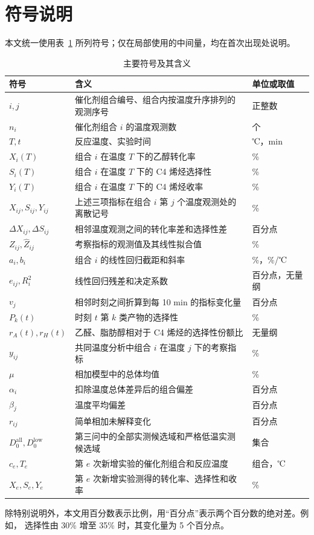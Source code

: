 \section{符号说明}\label{sec:symbols}

本文统一使用表~\ref{tab:symbols} 所列符号；仅在局部使用的中间量，均在首次出现处说明。

\begin{table}[H]
\centering
\caption{主要符号及其含义}
\label{tab:symbols}
\small
\renewcommand{\arraystretch}{1.12}
\setlength{\tabcolsep}{6pt}
\begin{tabular}{
  >{\centering\arraybackslash}p{2.8cm}
  p{8.8cm}
  >{\centering\arraybackslash}p{2.8cm}}
\toprule
符号 & 含义 & 单位或取值 \\
\midrule
\(i,j\) & 催化剂组合编号、组合内按温度升序排列的观测序号 & 正整数 \\
\(n_i\) & 催化剂组合 \(i\) 的温度观测数 & 个 \\
\(T,t\) & 反应温度、实验时间 & ℃，min \\
\(X_i(T)\) & 组合 \(i\) 在温度 \(T\) 下的乙醇转化率 & \% \\
\(S_i(T)\) & 组合 \(i\) 在温度 \(T\) 下的 C4 烯烃选择性 & \% \\
\(Y_i(T)\) & 组合 \(i\) 在温度 \(T\) 下的 C4 烯烃收率 & \% \\
\(X_{ij},S_{ij},Y_{ij}\) & 上述三项指标在组合 \(i\) 第 \(j\) 个温度观测处的离散记号 & \% \\
\(\Delta X_{ij},\Delta S_{ij}\) & 相邻温度观测之间的转化率差和选择性差 & 百分点 \\
\(Z_{ij},\widehat Z_{ij}\) & 考察指标的观测值及其线性拟合值 & \% \\
\(a_i,b_i\) & 组合 \(i\) 的线性回归截距和斜率 & \%，\%/℃ \\
\(e_{ij},R_i^2\) & 线性回归残差和决定系数 & 百分点，无量纲 \\
\(v_j\) & 相邻时刻之间折算到每 10 min 的指标变化量 & 百分点 \\
\(P_k(t)\) & 时刻 \(t\) 第 \(k\) 类产物的选择性 & \% \\
\(r_A(t),r_H(t)\) & 乙醛、脂肪醇相对于 C4 烯烃的选择性份额比 & 无量纲 \\
\(y_{ij}\) & 共同温度分析中组合 \(i\) 在温度 \(j\) 下的考察指标 & \% \\
\(\mu\) & 相加模型中的总体均值 & \% \\
\(\alpha_i\) & 扣除温度总体差异后的组合偏差 & 百分点 \\
\(\beta_j\) & 温度平均偏差 & 百分点 \\
\(r_{ij}\) & 简单相加未解释变化 & 百分点 \\
\(D_{0}^{\mathrm{all}},D_{0}^{\mathrm{low}}\) & 第三问中的全部实测候选域和严格低温实测候选域 & 集合 \\
\(c_e,T_e\) & 第 \(e\) 次新增实验的催化剂组合和反应温度 & 组合，℃ \\
\(X_e,S_e,Y_e\) & 第 \(e\) 次新增实验测得的转化率、选择性和收率 & \% \\
\bottomrule
\end{tabular}
\end{table}

除特别说明外，本文用百分数表示比例，用``百分点''表示两个百分数的绝对差。例如，
选择性由 30\% 增至 35\% 时，其变化量为 5 个百分点。
